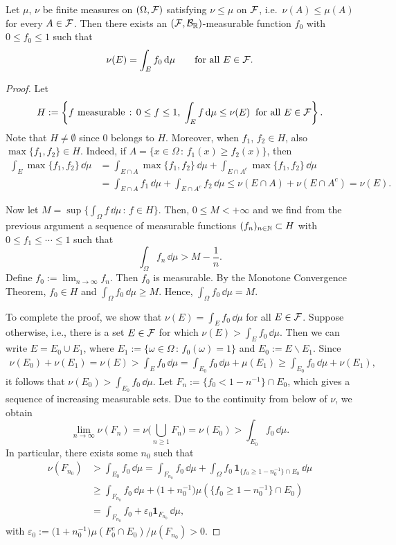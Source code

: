 \begin{lemma}\label{lem:partial-radon-nikodym}
	Let $\mu$, $\nu$ be finite measures on $(\Omega,\mathcal F)$ satisfying $\nu\le \mu$ on $\mathcal F$, i.e.\ $\nu(A)\le \mu(A)$ for every $A\in\mathcal F$. Then there exists an $(\mathcal F,\mathcal B_{\mathbb R})$-measurable function $f_0$ with $0\le f_0\le 1$ such that
	\[
		\nu(E) = \int_E f_0\,\mathrm{d}\mu\qquad\text{for all $E\in\mathcal F$}.
	\]
\end{lemma}
\begin{proof}
	Let
	\[
		H := \left\{\text{$f$ measurable}\,:\, 0\le f\le 1,\; \int_E f\,\mathrm{d}\mu \le \nu(E)\;\;\text{for all $E\in\mathcal F$}\right\}.
	\]
	Note that $H\ne \emptyset$ since $0$ belongs to $H$. Moreover, when $f_1$, $f_2\in H$, also $\max\{f_1,f_2\}\in H$. Indeed, if $A=\{x\in\Omega\,:\, f_1(x)\ge f_2(x)\}$, then
	\begin{align*}
		\int_E \max\{f_1,f_2\}\,\dd\mu &= \int_{E\cap A} \max\{f_1,f_2\}\,\dd\mu + \int_{E\cap A^c} \max\{f_1,f_2\}\,\dd\mu \\
		&= \int_{E\cap A} f_1\,\dd\mu + \int_{E\cap A^c} f_2\,\dd\mu \le \nu(E\cap A) + \nu(E\cap A^c) = \nu(E).
	\end{align*}
	
	Now let $M=\sup\{\int_\Omega f\,\dd\mu\,:\,f\in H\}$. Then, $0\le M<+\infty$ and we find from the previous argument a sequence of measurable functions $(f_n)_{n\in\mathbb N}\subset H$ with $0\le f_1\le \cdots\le 1$ such that
	\[
		\int_\Omega f_n\,\dd\mu > M - \frac{1}{n}.
	\] 
	Define $f_0:= \lim_{n\to\infty} f_n$. Then $f_0$ is measurable. By the Monotone Convergence Theorem, $f_0\in H$ and $\int_\Omega f_0\,\dd\mu \ge M$. Hence, $\int_\Omega f_0\,\dd\mu = M$.
	
	To complete the proof, we show that $\nu(E)=\int_E f_0\,\dd\mu$ for all $E\in\mathcal F$. Suppose otherwise, i.e., there is a set $E\in\mathcal F$ for which $\nu(E)>\int_E f_0\,\dd\mu$. Then we can write $E=E_0\cup E_1$, where $E_1:= \{ \omega\in\Omega\,:\, f_0(\omega)=1\}$ and $E_0:= E\backslash E_1$. Since
	\begin{align*}
		\nu(E_0) + \nu(E_1) = \nu(E) > \int_E f_0\,\dd\mu = \int_{E_0} f_0\,\dd\mu + \mu(E_1) \ge \int_{E_0} f_0\,\dd\mu + \nu(E_1),
	\end{align*}
	it follows that $\nu(E_0)>\int_{E_0} f_0\,\dd\mu$. Let $F_n:= \{f_0<1-n^{-1}\}\cap E_0$, which gives a sequence of increasing measurable sets. Due to the continuity from below of $\nu$, we obtain
	\[
		\lim_{n\to\infty}\nu(F_n) = \nu\Biggl(\bigcup_{n\ge 1} F_n\Biggr) = \nu(E_0)>\int_{E_0} f_0\,\dd\mu.
	\]
	In particular, there exists some $n_0$ such that
	\begin{align*}
		\nu(F_{n_0}) &> \int_{E_0} f_0\,\dd\mu = \int_{F_{n_0}}f_0\,\dd\mu + \int_\Omega f_0\,\mathbf{1}_{\{f_0\ge 1-n_0^{-1}\}\cap E_0}\,\dd\mu \\
		&\ge \int_{F_{n_0}}f_0\, \dd\mu + \bigl(1 + n_0^{-1}\bigr)\mu(\{f_0\ge 1-n_0^{-1}\}\cap E_0) \\
		&= \int_{F_{n_0}}f_0 + \varepsilon_0\mathbf{1}_{F_{n_0}}\, \dd\mu,
	\end{align*}
	with $\varepsilon_0 := \bigl(1 + n_0^{-1}\bigr)\mu(F_0^c\cap E_0)/\mu(F_{n_0}) >0$. 
	

\end{proof}
